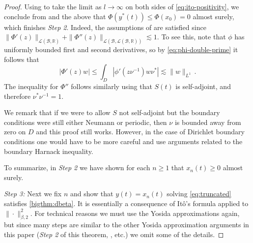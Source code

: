\documentclass[final]{amsart}
\numberwithin{thm}{section}
\numberwithin{equation}{section}
\newcommand{\R}{\mathbb{R}}
\newcommand{\Ll}{\mathcal{L}}
\newcommand{\B}{\mathcal{B}}
\begin{document}
\begin{proof}
    Using  to take the limit as $l \to \infty$ on both sides of \eqref{eq:ito-positivity}, we conclude from  and the above that $\Phi(y^*(t)) \leq \Phi(x_0) = 0$ almost surely, which finishes \textit{Step 2}. Indeed, the assumptions of  are satisfied since $\|\Phi'(z)\|_{\Ll(\B,\R)} + \|\Phi''(z)\|_{\Ll(\B,\Ll(\B,\R))} \lesssim 1$. To see this, note that $\phi$ has uniformly bounded first and second derivatives, so by \eqref{eq:phi-double-prime} it follows that
    $$|\Phi'(z)w| \leq \int_D |\phi'(z\nu^{-1})w\nu^*| \lesssim \|w\|_{L^1} \,.$$
    The inequality for $\Phi''$ follows similarly using that $S(t)$ is self-adjoint, and therefore $\nu^*\nu^{-1} = 1$. 
    
    We remark that if we were to allow $S$ not self-adjoint but the boundary conditions were still either Neumann or periodic, then $\nu$ is bounded away from zero on $D$ and this proof still works. However, in  the case of Dirichlet boundary conditions one would have to be more careful and use arguments related to the boundary Harnack inequality.
    
    


     
     

     To summarize, in \textit{Step 2} we have shown for each $n\geq 1$ that $x_n(t) \geq 0$ almost surely.
    
    
    
    
    
    
    
    
    
    
    
    
    
    
    

    
    
    
    
    
    
    
    
    
    
    
    
    
    \textit{Step 3:}
    Next we fix $n$ and show that $y(t) = x_n(t)$ solving 
    \eqref{eq:truncated} satisfies \ref{bigthm:dbeta}. It is essentially a consequence of It\^{o}'s formula applied to $\|\cdot\|_{\beta,2}^2$. For technical reasons we must use the Yosida approximations again, but since many steps are similar to the other Yosida approximation arguments in this paper (\textit{Step 2} of this theorem, , etc.) we omit some of the details.
    

\end{proof}
\end{document}
